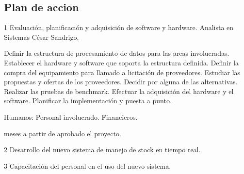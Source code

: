 \subsection{Plan de accion}

\begin{proyecto}
{1}
{Evaluación, planificación y adquisición de software y hardware.}
{Analista en Sistemas César Sandrigo.}

  \begin{etapas}
    \etapa Definir la estructura de procesamiento de datos para las areas involucradas.
    \etapa Establecer el hardware y software que soporta la estructura definida.
    \etapa Definir la compra del equipamiento para llamado a licitación de proveedores.
    \etapa Estudiar las propuestas y ofertas de los proveedores.
    \etapa Decidir por alguna de las alternativas.
    \etapa Realizar las pruebas de benchmark.
    \etapa Efectuar la adquisición del hardware y el software.
    \etapa Planificar la implementación y puesta a punto.
  \end{etapas}

  \begin{recursos}
    \recurso Humanos: Personal involucrado.
    \recurso Financieros.
  \end{recursos}

   meses a partir de aprobado el proyecto.
\end{proyecto}


\begin{proyecto}
{2}
{Desarrollo del nuevo sistema de manejo de stock en tiempo real.}
{}

  \begin{etapas}
    \etapa {}
  \end{etapas}

  \begin{recursos}
    \recurso {}
  \end{recursos}

  \tiempo {}
\end{proyecto}


\begin{proyecto}
{3}
{Capacitación del personal en el uso del nuevo sistema.}
{}

  \begin{etapas}
    \etapa {}
  \end{etapas}

  \begin{recursos}
    \recurso {}
  \end{recursos}

  \tiempo {}
\end{proyecto}


